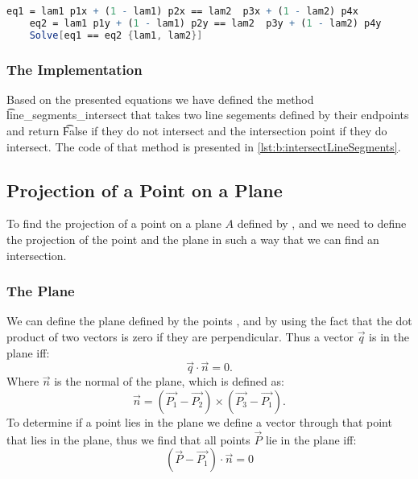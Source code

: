 		\begin{lstlisting}[float, language=Mathematica, label={lst:b:mat_lineSegmentIntersection}, caption={Mathematica code used to solve \autoref{eq:b:linesegmentintersectionequation}.}]
	eq1 = lam1 p1x + (1 - lam1) p2x == lam2  p3x + (1 - lam2) p4x
	eq2 = lam1 p1y + (1 - lam1) p2y == lam2  p3y + (1 - lam2) p4y
	Solve[eq1 == eq2 {lam1, lam2}]\end{lstlisting}

	\subsubsection*{The Implementation}
		Based on the presented equations we have defined the method \t{line_segments_intersect} that takes two line segements defined by their endpoints and return \t{False} if they do not intersect and the intersection point if they do intersect. The code of that method is presented in \autoref{lst:b:intersectLineSegments}.

		

\subsection*{Projection of a Point on a Plane}
	To find the projection of a point  on a plane $A$ defined by ,  and  we need to define the projection of the point and the plane in such a way that we can find an intersection.

		\subsubsection*{The Plane}
		We can define the plane defined by the points ,  and  by using the fact that the dot product of two vectors is zero if they are perpendicular. Thus a vector $\vec{q}$ is in the plane iff:
			\begin{equation}
				\vec{q} \cdot \vec{n} = 0.
			\end{equation}
		Where $\vec{n}$ is the normal of the plane, which is defined as:
			 \begin{equation}
			 	\vec{n} = (\vec{P_1} - \vec{P_2}) \times (\vec{P_3} - \vec{P_1}).
			 \end{equation}
		To determine if a point  lies in the plane we define a vector through that point that lies in the plane, thus we find that all points $\vec{P}$ lie in the plane iff:
			\begin{equation} \label{eq:b:plane}
				(\vec{P} - \vec{P_1}) \cdot \vec{n} = 0
			\end{equation}\\

